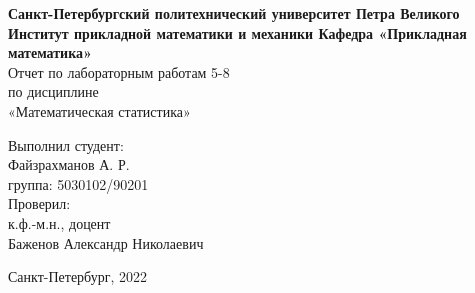 \documentclass[oneside,final]{article}
\begin{document}
	\begin{titlepage}
		\newpage 
		\begin{center}
			{\bfseries Санкт-Петербургский политехнический университет
			Петра Великого \\
			Институт прикладной математики и механики
				Кафедра «Прикладная математика»\\}  
			\vfill
			\vfill
			\normalsize{Отчет по лабораторным работам 5-8\\
					по дисциплине\\
				«Математическая статистика»\\}   
			\vfill		                    
		\end{center}
		\begin{flushright}
		\begin{minipage}{.45\textwidth}
			\normalsize{Выполнил студент:\\
			Файзрахманов А. Р. \\
			группа: 5030102/90201}
			\break\hfill\break
			\\
			\normalsize{Проверил:\\
			к.ф.-м.н., доцент\\
			Баженов Александр Николаевич} 
		
\end{minipage}
		\end{flushright}
		\begin{center}
			\vfill
			\normalsize{Санкт-Петербург, 2022}
		\end{center}
	\end{titlepage}

	\tableofcontents
	\newpage
	\listoffigures
	\newpage
	\listoftables
	\newpage
	
	
\end{document}
